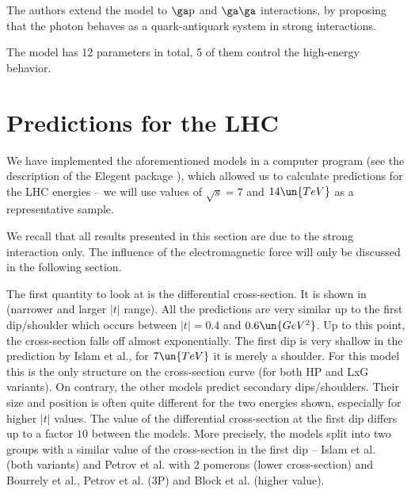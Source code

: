 The authors extend the model to $\rm\ga p$ and $\rm\ga\ga$ interactions, by proposing that the photon behaves as a quark-antiquark system in strong interactions.

The model has 12 parameters in total, 5 of them control the high-energy behavior.

\section[el pred]{Predictions for the LHC}

We have implemented the aforementioned models in a computer program (see the description of the Elegent package ), which allowed us to calculate predictions for the LHC energies -- we will use values of $\sqrt s = 7$ and $14\un{TeV}$ as a representative sample.

We recall that all results presented in this section are due to the strong interaction only. The influence of the electromagnetic force will only be discussed in the following section.

The first quantity to look at is the differential cross-section. It is shown in  (narrower and larger $|t|$ range). All the predictions are very similar up to the first dip/shoulder which occurs between $|t| = 0.4$ and $0.6\un{GeV^2}$. Up to this point, the cross-section falls off almost exponentially. The first dip is very shallow in the prediction by Islam et al., for $7\un{TeV}$ it is merely a shoulder. For this model this is the only structure on the cross-section curve (for both HP and LxG variants). On contrary, the other models predict secondary dips/shoulders. Their size and position is often quite different for the two energies shown, especially for higher $|t|$ values. The value of the differential cross-section at the first dip differs up to a factor $10$ between the models. More precisely, the models split into two groups with a similar value of the cross-section in the first dip -- Islam et al. (both variants) and Petrov et al. with 2 pomerons (lower cross-section) and Bourrely et al., Petrov et al. (3P) and Block et al. (higher value).



